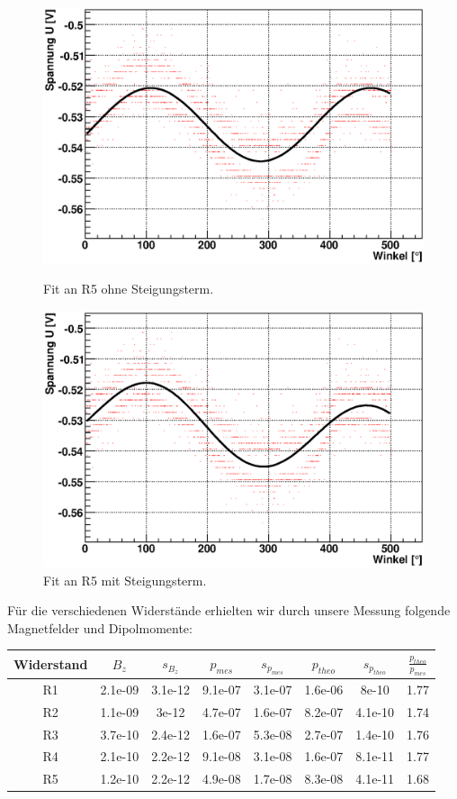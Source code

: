 \documentclass[12pt]{article}
\begin{document}
\begin{figure}[H]  
\begin{minipage}{0.5\linewidth}
\centering
\includegraphics[width=0.9\linewidth]{pictures/R5_ohne.eps}
\caption{Fit an R5 ohne Steigungsterm.}
\end{minipage}
\begin{minipage}{0.5\linewidth}
\centering 
\includegraphics[width=0.9\linewidth]{pictures/R5_mit.eps}
\caption{Fit an R5 mit Steigungsterm.}
\end{minipage}
\end{figure}

Für die verschiedenen Widerstände erhielten wir durch unsere Messung folgende Magnetfelder und Dipolmomente:
\begin{center}
\begin{tabular}{|c|cc|cc|cc|c|}
\hline
Widerstand & $B_z$ & $s_{B_z}$ & $p_{mes}$ & $s_{p_{mes}}$ & $p_{theo}$ & $s_{p_{theo}}$ & $\frac{p_{theo}}{p_{mes}}$ \\
\hline
R1 & 2.1e-09 & 3.1e-12 & 9.1e-07 & 3.1e-07 & 1.6e-06 & 8e-10 & 1.77 \\
R2 & 1.1e-09 & 3e-12 & 4.7e-07 & 1.6e-07 & 8.2e-07 & 4.1e-10 & 1.74 \\
R3 & 3.7e-10 & 2.4e-12 & 1.6e-07 & 5.3e-08 & 2.7e-07 & 1.4e-10 & 1.76 \\
R4 & 2.1e-10 & 2.2e-12 & 9.1e-08 & 3.1e-08 & 1.6e-07 & 8.1e-11 & 1.77 \\
R5 & 1.2e-10 & 2.2e-12 & 4.9e-08 & 1.7e-08 & 8.3e-08 & 4.1e-11 & 1.68 \\
\hline
\end{tabular}
\end{center}
\end{document}
